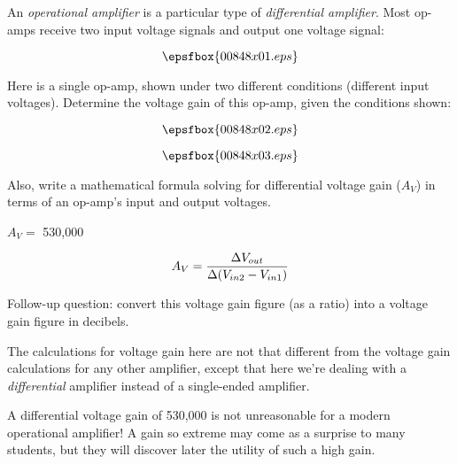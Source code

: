 

An {\it operational amplifier} is a particular type of {\it differential amplifier}.  Most op-amps receive two input voltage signals and output one voltage signal:

$$\epsfbox{00848x01.eps}$$

Here is a single op-amp, shown under two different conditions (different input voltages).  Determine the voltage gain of this op-amp, given the conditions shown:

$$\epsfbox{00848x02.eps}$$

$$\epsfbox{00848x03.eps}$$

\vskip 10pt

Also, write a mathematical formula solving for differential voltage gain ($A_V$) in terms of an op-amp's input and output voltages.







$A_V =$ 530,000

$$A_V = {\Delta V_{out} \over \Delta (V_{in2} - V_{in1})}$$

\vskip 10pt

Follow-up question: convert this voltage gain figure (as a ratio) into a voltage gain figure in decibels.







The calculations for voltage gain here are not that different from the voltage gain calculations for any other amplifier, except that here we're dealing with a {\it differential} amplifier instead of a single-ended amplifier.

A differential voltage gain of 530,000 is not unreasonable for a modern operational amplifier!  A gain so extreme may come as a surprise to many students, but they will discover later the utility of such a high gain.




